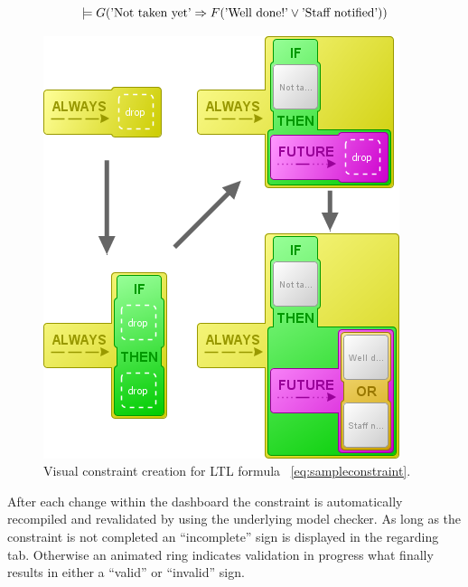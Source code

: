 \documentclass[conference]{IEEEtran}
\begin{document}
\begin{equation} \label{eq:sampleconstraint}
  \models G (\textnormal{'Not taken yet'} \Rightarrow F (\textnormal{'Well done!'} \vee \textnormal{'Staff notified'}))
\end{equation}


\begin{figure}[htbp]
  \centering
  \includegraphics[scale=0.5]{sampleconstraint}
  \caption{Visual constraint creation for LTL formula ~\ref{eq:sampleconstraint}.}
  \label{fig:sampleconstraint}
\end{figure}

After each change within the dashboard the constraint is automatically recompiled and revalidated by using the underlying model checker. As long as the constraint is not completed an ``incomplete'' sign is displayed in the regarding tab. Otherwise an animated ring indicates validation in progress what finally results in either a ``valid'' or ``invalid'' sign.
\end{document}
